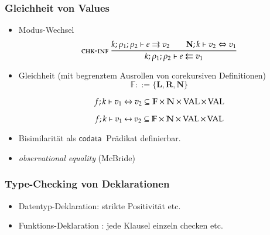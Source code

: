 \documentclass[12pt,red,serif,mathserif]{beamer}
\newcommand{\codata}{\mathsf{codata}\:}
\newcommand{\rulename}[1]{\ensuremath{\mbox{\sc#1}}}
\newcommand{\ru}{\dfrac}
\newcommand{\nru}[3]{#1\ \ru{#2}{#3}}
\newcommand{\chkinf}{\rulename{chk-inf}}
\newcommand{\cN}{\mathbb{N}}
\newcommand{\cF}{\mathbb{F}}
\newcommand{\nF}{\mathbf{N}}
\newcommand{\lF}{\mathbf{L}}
\newcommand{\rF}{\mathbf{R}}
\newcommand{\opn}[1]{\operatorname{#1}}
\newcommand{\Val}{\opn{VAL}}
\begin{document}
\frame
{


\frametitle{Gleichheit von Values}

\begin{itemize}
\item Modus-Wechsel
\[
\nru{\chkinf}
{\Infer{k}{\rho_1}{\rho_2}{e}{v_2}
\qquad
{\EqVal{\nF}{k}{v_2}{v_1}}} 
{\Check{k}{\rho_1}{\rho_2}{e}{v_1}}
\]
\item Gleichheit (mit begrenztem Ausrollen von corekursiven Definitionen)
\[ \cF ::= \{\lF, \rF, \nF \} \]

\[\EqVal{f}{k}{v_1}{v_2} \subseteq \cF \times \cN \times \Val \times \Val \]

\[\FeqVal{f}{k}{v_1}{v_2} \subseteq \cF \times \cN \times\Val \times \Val \]
\item
Bisimilarit\"at als $\codata$ Pr\"adikat definierbar.
\item
\emph{observational equality} (McBride) 
\end{itemize}
}

\frame
{

\frametitle{Type-Checking von Deklarationen}

\begin{itemize}
\item
Datentyp-Deklaration: strikte Positivit\"at etc.
\item
Funktions-Deklaration : jede Klausel einzeln checken etc.
\end{itemize}

}
\end{document}
